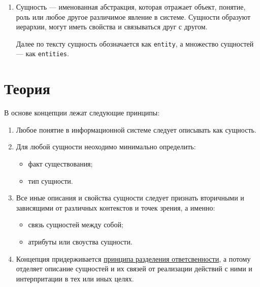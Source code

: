 \documentclass[final]{article}
\begin{document}
        \begin{enumerate}

            \item Сущность — именованная абстракция, которая отражает объект, 
            понятие, роль или любое другое различимое явление в системе. 
            Сущности образуют иерархии, могут иметь свойства и связываться друг 
            с другом.

            Далее по тексту сущность обозначается как \texttt{entity}, а 
            множество сущностей — как \texttt{entities}.

        \end{enumerate}

    \section{Теория}

        В основе концепции лежат следующие принципы:

        \begin{enumerate}
            \item Любое понятие в информационной системе следует описывать как 
            сущность.

            \item Для любой сущности неоходимо минимально определить:
            \begin{itemize}
                \item факт существования;
                \item тип сущности.
            \end{itemize}

            \item Все иные описания и свойства сущности следует признать вторичными 
            и зависящими от различных контекстов и точек зрения, а именно:
            \begin{itemize}
                \item связь сущностей между собой;
                \item атрибуты или своуства сущности.
            \end{itemize}

            \item Концепция придерживается 
            \href{https://ru.wikipedia.org/wiki/%D0%A0%D0%B0%D0%B7%D0%B4%D0%B5%D0%BB%D0%B5%D0%BD%D0%B8%D0%B5_%D0%BE%D1%82%D0%B2%D0%B5%D1%82%D1%81%D1%82%D0%B2%D0%B5%D0%BD%D0%BD%D0%BE%D1%81%D1%82%D0%B8}{принципа 
            разделения ответсвенности}, а потому отделяет описание сущностей и их 
            связей от реализации действий с ними и интерпритации в тех или иных 
            целях.

        \end{enumerate}
\end{document}
